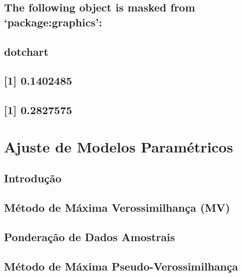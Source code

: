 \documentclass[]{book}
\theoremstyle{definition}
\theoremstyle{definition}
\theoremstyle{definition}
\theoremstyle{remark}
\begin{document}
\section{\texorpdfstring{The following object is masked from
`package:graphics':}{The following object is masked from package:graphics:}}\label{the-following-object-is-masked-from-packagegraphics}

\section{}\label{section-20}

\section{dotchart}\label{dotchart}

\section{{[}1{]} 0.1402485}\label{section-21}

\section{{[}1{]} 0.2827575}\label{section-22}

\chapter{Ajuste de Modelos Paramétricos}\label{ajmodpar}

\section{Introdução}\label{modpar1}

\section{Método de Máxima Verossimilhança
(MV)}\label{metodo-de-maxima-verossimilhanca-mv}

\section{Ponderação de Dados
Amostrais}\label{ponderacao-de-dados-amostrais}

\section{Método de Máxima Pseudo-Verossimilhança}\label{modpar3}
\end{document}
